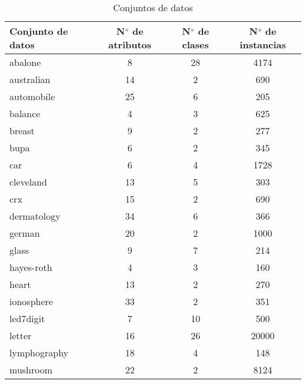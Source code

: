 \begin{table}[H]
\centering
\caption{Conjuntos de datos}
\label{tab:DS}
\begin{tabular}{@{}lccc@{}}
\toprule
Conjunto de datos & N$\degree$ de atributos & N$\degree$ de clases & N$\degree$ de instancias \\ \midrule
abalone           & 8                   & 28               & 4174                 \\
australian        & 14                  & 2                & 690                  \\
automobile        & 25                  & 6                & 205                  \\
balance           & 4                   & 3                & 625                  \\
breast            & 9                   & 2                & 277                  \\
bupa              & 6                   & 2                & 345                  \\
car               & 6                   & 4                & 1728                 \\
cleveland         & 13                  & 5                & 303                  \\
crx               & 15                  & 2                & 690                  \\
dermatology       & 34                  & 6                & 366                  \\
german            & 20                  & 2                & 1000                 \\
glass             & 9                   & 7                & 214                  \\
hayes-roth        & 4                   & 3                & 160                  \\
heart             & 13                  & 2                & 270                  \\
ionosphere        & 33                  & 2                & 351                  \\
led7digit         & 7                   & 10               & 500                  \\
letter            & 16                  & 26               & 20000                \\
lymphography      & 18                  & 4                & 148                  \\
mushroom          & 22                  & 2                & 8124                 \\

\end{tabular}
\end{table}
